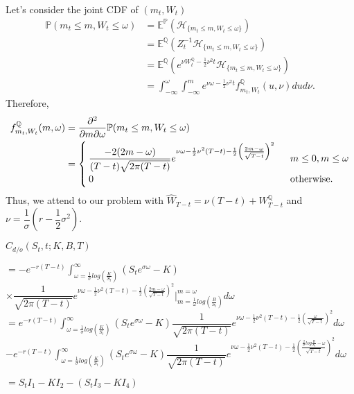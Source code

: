 Let's  consider the joint CDF of $(m_t, W_t)$
\begin{align*}
		\mathbb{P}(m_t\leq m, W_t \leq \omega)&=\mathbb{E}^\mathbb{P}(\mathcal{H}_{\{m_t\leq m, W_t \leq \omega\}})\\
		&=\mathbb{E}^\mathbb{Q}(Z_t^{-1}\mathcal{H}_{\{m_t\leq m, W_t \leq \omega\}})\\
		&=\mathbb{E}^\mathbb{Q}(e^{\nu W_t^\mathbb{Q}-\frac{1}{2}\nu^2t}\mathcal{H}_{\{m_t\leq m, W_t \leq \omega\}})\\
		&=\displaystyle \int_{-\infty}^{\omega} \displaystyle \int_{-\infty}^{m}e^{\nu \omega-\frac{1}{2}\nu^2 t}f_{m_t, W_t}^\mathbb{Q}(u, \nu)dud\nu. 
\end{align*}
Therefore, 
\begin{align*}
f^\mathbb{Q}_{m_t,W_t}(m, \omega)&= \dfrac{\partial^2}{\partial m \partial \omega}\mathbb{P}(m_t\leq m, W_t \leq \omega)\\
&=\begin{cases}
\dfrac{-2(2m-\omega)}{(T-t)\sqrt{2\pi (T-t)}}e^{\nu\omega-\frac{1}{2}\nu^2(T-t)-\frac{1}{2}\left(\frac{2m-\omega}{\sqrt{T-t}}\right)^2} \hspace{0.2cm} &m\leq 0,m\leq \omega   \nonumber \\
0 &\text{otherwise.}  \nonumber
\end{cases}
\end{align*}
Thus, we attend to our problem with  $\widehat{W}_{T-t}=\nu (T-t)+W_{T-t}^\mathbb{Q}$ and $\nu=\dfrac{1}{\sigma}(r-\dfrac{1}{2}\sigma^2)$.
\begin{flushleft}
$C_{d/o}(S_t,t;K,B,T)$ \\ \vspace{0.1cm}
 
$=-e^{-r(T-t)}\displaystyle \int_{\omega =\frac{1}{\sigma}log\left(\frac{K}{S_t}\right) }^{\infty}(S_te^{\sigma \omega}-K)$\\
$\times \dfrac{1}{\sqrt{2\pi (T-t)}}e^{\nu\omega-\frac{1}{2}\nu^2(T-t)-\frac{1}{2}\left(\frac{2m-\omega}{\sqrt{T-t}}\right)^2}\bigg|_{m=\frac{1}{\omega}log\left(\frac{B}{S_t}\right)}^{m=\omega}d\omega$\\
$=e^{-r(T-t)}\displaystyle \int_{\omega =\frac{1}{\sigma}log\left(\frac{K}{S_t}\right) }^{\infty}(S_te^{\sigma \omega}-K)\dfrac{1}{\sqrt{2\pi (T-t)}}e^{\nu\omega-\frac{1}{2}\nu^2(T-t)-\frac{1}{2}\left(\frac{\omega}{\sqrt{T-t}}\right)^2}d\omega$\\
$-e^{-r(T-t)}\displaystyle \int_{\omega =\frac{1}{\sigma}log\left(\frac{K}{S_t}\right) }^{\infty}(S_te^{\sigma \omega}-K)\dfrac{1}{\sqrt{2\pi (T-t)}}e^{\nu\omega-\frac{1}{2}\nu^2(T-t)-\frac{1}{2}\left(\frac{\frac{2}{\sigma}log\frac{B}{S_t}-\omega}{\sqrt{T-t}}\right)^2}d\omega$\\ \vspace{0.1cm}

$=S_tI_1-KI_2-(S_tI_3-KI_4)$
\end{flushleft}
